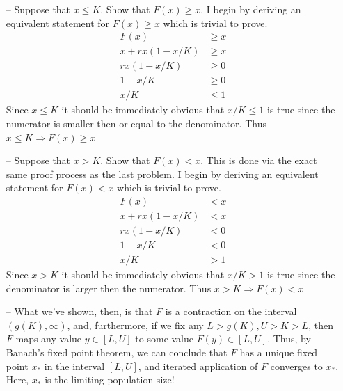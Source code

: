 \documentclass{article}
\begin{document}
\begin{itemize}
\begin{itemize}
        \newpage
        \item[--] Suppose that $x \leq K$. Show that $F(x) \geq x$.
        \newline\newline
        I begin by deriving an equivalent statement for $F(x) \geq x$ which is trivial to prove.
        \begin{equation}
        \begin{split}
            F(x) &\geq x \\
            x + rx(1 - x/K) &\geq x \\
            rx(1-x/K) &\geq 0 \\
            1-x/K &\geq 0 \\
            x/K &\leq 1
        \end{split}
        \end{equation}
        Since $x \leq K$ it should be immediately obvious that $x/K \leq 1$ is true since the numerator is smaller then or equal to the denominator. Thus $x \leq K \Rightarrow F(x) \geq x$
        \newline
        \item[--] Suppose that $x > K$. Show that $F(x) < x$.
        \newline\newline
        This is done via the exact same proof process as the last problem. I begin by deriving an equivalent statement for $F(x) < x$ which is trivial to prove.
        \begin{equation}
        \begin{split}
            F(x) &< x \\
            x + rx(1 - x/K) &< x \\
            rx(1-x/K) &< 0 \\
            1-x/K &< 0 \\
            x/K &> 1
        \end{split}
        \end{equation}
        Since $x > K$ it should be immediately obvious that $x/K > 1$ is true since the denominator is larger then the numerator. Thus $x > K \Rightarrow F(x) < x$
        \newline
        \item[--] What we've shown, then, is that $F$ is a contraction on the interval $(g(K), \infty)$, and, furthermore, if we fix any $L > g(K), U > K > L$, then $F$ maps any value $y \in [L, U]$ to some value $F(y) \in [L, U]$. Thus, by Banach’s fixed point theorem, we can conclude that $F$ has a unique fixed point $x_*$ in the interval $[L, U]$, and iterated application of $F$ converges to $x_*$. Here, $x_*$ is the limiting population size! \newline

\end{itemize}
\end{itemize}
\end{document}
